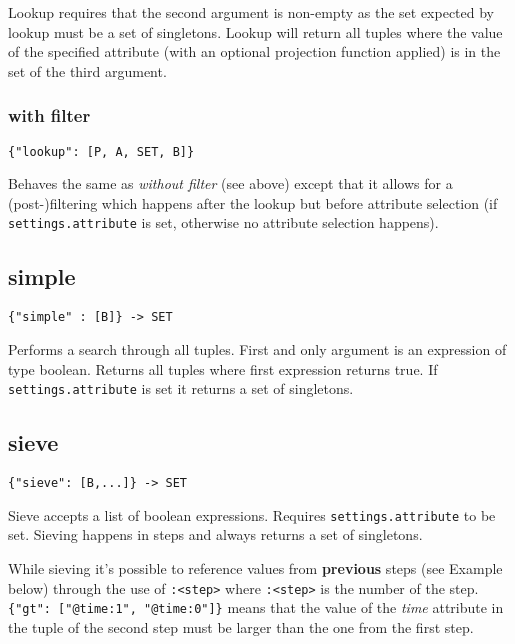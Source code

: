 \documentclass[a4paper]{article}
\begin{document}
Lookup requires that the second argument is non-empty as the set
expected by lookup must be a set of singletons. Lookup will return all
tuples where the value of the specified attribute (with an optional
projection function applied) is in the set of the third argument.

\subsubsection{with filter}

\begin{verbatim}
{"lookup": [P, A, SET, B]}
\end{verbatim}

Behaves the same as \textit{without filter} (see above) except that it
allows for a (post-)filtering which happens after the lookup but
before attribute selection (if \verb|settings.attribute| is set,
otherwise no attribute selection happens).


\subsection{simple}

\begin{verbatim}
{"simple" : [B]} -> SET
\end{verbatim}

Performs a search through all tuples. First and only argument is an
expression of type boolean. Returns all tuples where first expression
returns true. If \verb|settings.attribute| is set it returns a set of
singletons.

\subsection{sieve}

\begin{verbatim}
{"sieve": [B,...]} -> SET
\end{verbatim}

Sieve accepts a list of boolean expressions. Requires
\verb|settings.attribute| to be set. Sieving happens in steps and
always returns a set of singletons.

While sieving it's possible to reference values from \textbf{previous}
steps (see Example below) through the use of \verb|:<step>| where
\verb|:<step>| is the number of the step.
\verb|{"gt": ["@time:1", "@time:0"]}| means that the value of the
\textit{time} attribute in the tuple of the second step must be larger
than the one from the first step.
\end{document}
